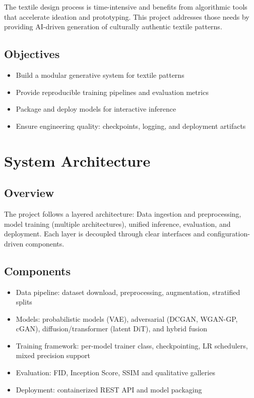\documentclass[12pt,a4paper]{report}
\begin{document}
The textile design process is time-intensive and benefits from algorithmic tools that accelerate ideation and prototyping. This project addresses those needs by providing AI-driven generation of culturally authentic textile patterns.

\section{Objectives}

\begin{itemize}[nosep]
  \item Build a modular generative system for textile patterns
  \item Provide reproducible training pipelines and evaluation metrics
  \item Package and deploy models for interactive inference
  \item Ensure engineering quality: checkpoints, logging, and deployment artifacts
\end{itemize}

\chapter{System Architecture}

\section{Overview}

The project follows a layered architecture: Data ingestion and preprocessing, model training (multiple architectures), unified inference, evaluation, and deployment. Each layer is decoupled through clear interfaces and configuration-driven components.

\section{Components}

\begin{itemize}
  \item Data pipeline: dataset download, preprocessing, augmentation, stratified splits
  \item Models: probabilistic models (VAE), adversarial (DCGAN, WGAN-GP, cGAN), diffusion/transformer (latent DiT), and hybrid fusion
  \item Training framework: per-model trainer class, checkpointing, LR schedulers, mixed precision support
  \item Evaluation: FID, Inception Score, SSIM and qualitative galleries
  \item Deployment: containerized REST API and model packaging
\end{itemize}
\end{document}
